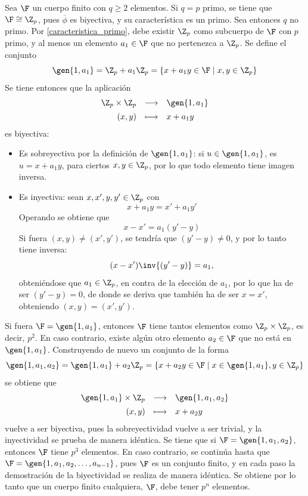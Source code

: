 \begin{dem}{\cite[p.~412]{GamboaAnillos}}
    Sea $\F$ un cuerpo finito con $q\geq2$ elementos. Si $q = p$ primo, se tiene que $\F \cong \Z_p$, pues $\overline{\phi}$ es biyectiva, y su característica es un primo. Sea entonces $q$ no primo. Por \ref{caracteristica_primo}, debe existir $\Z_p$ como subcuerpo de $\F$ con $p$ primo, y al menos un elemento $a_1\in\F$ que no pertenezca a $\Z_p$. Se define el conjunto 
    \[
    \gen{1,a_1} = \Z_p + a_1\Z_p = \{x + a_1y \in \F\mid x,y\in \Z_p\}
    \]
    Se tiene entonces que la aplicación 
    \[
    \begin{array}{rcl}
     \Z_p \times \Z_p & \longrightarrow & \gen{1,a_1} \\[1ex]
            (x,y) & \longmapsto & x + a_1y
    \end{array}
    \]
    es biyectiva:
    \begin{itemize}[label={--}]
        \item Es sobreyectiva por la definición de $\gen{1,a_1}$: si $u\in\gen{1,a_1}$, es $u = x + a_1y$, para ciertos $x,y\in\Z_p$, por lo que todo elemento tiene imagen inversa.
        \item Es inyectiva: sean $x,x',y,y'\in\Z_p$ con \[x + a_1y = x' + a_1y'\] Operando se obtiene que \[x - x' = a_1(y'-y)\] Si fuera $(x,y)\neq (x',y')$, se tendría que $(y'-y)\neq 0$, y por lo tanto tiene inversa: \[(x - x')\inv{(y'-y)} = a_1,\] obteniéndose que $a_1\in \Z_p$, en contra de la elección de $a_1$, por lo que ha de ser $(y'-y) = 0$, de donde se deriva que también ha de ser $x = x'$, obteniendo $(x,y) = (x',y')$.
    \end{itemize}
    Si fuera $\F = \gen{1,a_1}$, entonces $\F$ tiene tantos elementos como $\Z_p \times \Z_p$, es decir, $p^2$. En caso contrario, existe algún otro elemento $a_2\in \F$ que no está en $\gen{1,a_1}$. Construyendo de nuevo un conjunto de la forma 
    \[
    \gen{1,a_1,a_2} =  \gen{1,a_1} + a_2\Z_p = \{x + a_2y \in \F\mid x\in\gen{1,a_1}, y\in \Z_p\}
    \]
    se obtiene que
    \[
    \begin{array}{rcl}
     \gen{1,a_1} \times \Z_p & \longrightarrow & \gen{1,a_1, a_2} \\[1ex]
            (x,y) & \longmapsto & x + a_2y
    \end{array}
    \]
    vuelve a ser biyectiva, pues la sobreyectividad vuelve a ser trivial, y la inyectividad se prueba de manera idéntica. Se tiene que si $\F = \gen{1,a_1,a_2}$, entonces $\F$ tiene $p^3$ elementos. En caso contrario, se continúa hasta que $\F = \gen{1,a_1, a_2, \ldots, a_{n-1}}$, pues $\F$ es un conjunto finito, y en cada paso la demostración de la biyectividad se realiza de manera idéntica. Se obtiene por lo tanto que un cuerpo finito cualquiera, $\F$, debe tener $p^n$ elementos.
\end{dem}

